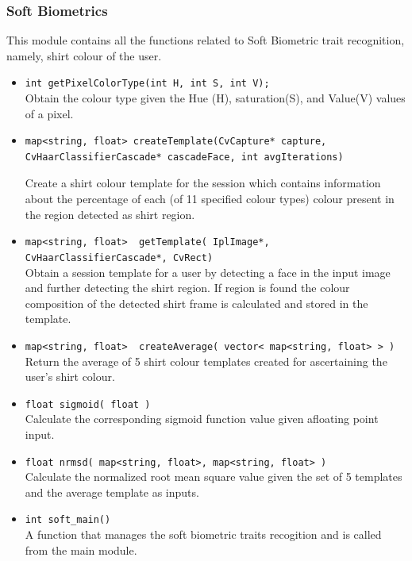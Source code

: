 \documentclass[12pt]{article}			%
\begin{document}
\subsubsection { Soft Biometrics }
This module contains all the functions related to Soft Biometric trait recognition, namely, shirt colour of the user.

\begin{itemize}
\item
\verb+int getPixelColorType(int H, int S, int V);+\\
Obtain the colour type given the Hue (H), saturation(S), and Value(V) values of a pixel.

\item
\begin{verbatim}
map<string, float> createTemplate(CvCapture* capture,
CvHaarClassifierCascade* cascadeFace, int avgIterations)
\end{verbatim}
Create a shirt colour template for the session which contains information about the percentage of each (of 11 specified colour types) colour present in the region detected as shirt region.
\item
\verb+map<string, float>  getTemplate( IplImage*, CvHaarClassifierCascade*, CvRect)+\\
Obtain a session template for a user by detecting a face in the input image and further detecting the shirt region. If region is found the colour composition of the detected shirt frame is calculated and stored in the template.

\item
\verb+map<string, float>  createAverage( vector< map<string, float> > )+\\
Return the average of 5 shirt colour templates created for ascertaining the user's shirt colour. 

\item
\verb+float sigmoid( float )+\\
Calculate the corresponding sigmoid function value given afloating point input. 

\item
\verb+float nrmsd( map<string, float>, map<string, float> )+\\
Calculate the normalized root mean square value given the set of 5 templates and the average template as inputs. 

\item
\verb+int soft_main()+\\
A function that manages the soft biometric traits recogition and is called from the main module.
\end{itemize}
\end{document}
